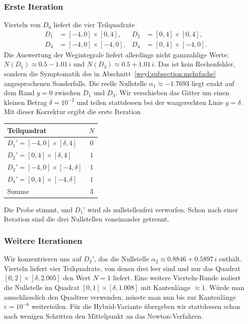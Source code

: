 \subsubsection*{Erste Iteration}
Vierteln von $D_0$ liefert die vier Teilquadrate
\begin{align*}
D_1 &= [-4, 0] \times [0, 4],
&
D_2 &= [0, 4] \times [0, 4],
\\
D_3 &= [-4, 0] \times [-4, 0],
&
D_4 &= [0, 4] \times [-4, 0].
\end{align*}
Die Auswertung der Wegintegrale liefert allerdings nicht ganzzahlige Werte:
$N(D_1) \approx 0.5 - 1.01\,i$ und $N(D_3) \approx 0.5 + 1.01\,i$.
Das ist kein Rechenfehler, sondern die Symptomatik des in
Abschnitt~\ref{weyl:subsection:mehrfache} angesprochenen Sonderfalls. Die reelle
Nullstelle $\alpha_1 \approx -1.7693$ liegt exakt auf dem Rand $y = 0$ zwischen $D_1$
und $D_3$.
Wir verschieben das Gitter um einen kleinen Betrag $\delta = 10^{-2}$ und teilen
stattdessen bei der waagerechten Linie $y = \delta$.
Mit dieser Korrektur ergibt die erste Iteration
\begin{center}
\begin{tabular}{lc}
\toprule
Teilquadrat & $N$ \\
\midrule
$D_1' = [-4, 0] \times [\delta, 4]$ & $0$ \\
$D_2' = [0, 4] \times [\delta, 4]$ & $1$ \\
$D_3' = [-4, 0] \times [-4, \delta]$ & $1$ \\
$D_4' = [0, 4] \times [-4, \delta]$ & $1$ \\
\midrule
Summe & $3$ \\
\bottomrule
\end{tabular}
\end{center}
Die Probe stimmt, und $D_1'$ wird als nullstellenfrei verworfen.
Schon nach einer Iteration sind die drei Nullstellen voneinander getrennt.

\subsubsection*{Weitere Iterationen}
Wir konzentrieren uns auf $D_2'$, das die Nullstelle $\alpha_2 \approx 0.8846 + 0.5897\,i$
enthält.
Vierteln liefert vier Teilquadrate, von denen drei leer sind und nur das
Quadrat $[0, 2] \times [\delta, 2.005]$ den Wert $N = 1$ liefert.
Eine weitere Vierteln-Runde isoliert die Nullstelle im Quadrat
$[0, 1] \times [\delta, 1.008]$ mit Kantenlänge $\approx 1$.
Würde man ausschliesslich den Quadtree verwenden, müsste man nun bis zur Kantenlänge
$\varepsilon = 10^{-6}$ weiterteilen.
Für die Hybrid-Variante übergeben wir stattdessen schon nach wenigen Schritten den
Mittelpunkt an das Newton-Verfahren.


